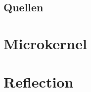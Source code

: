 \documentclass{scrbook}
\begin{document}
\section{Quellen}





\chapter{Microkernel}
\chapter{Reflection}
\end{document}
